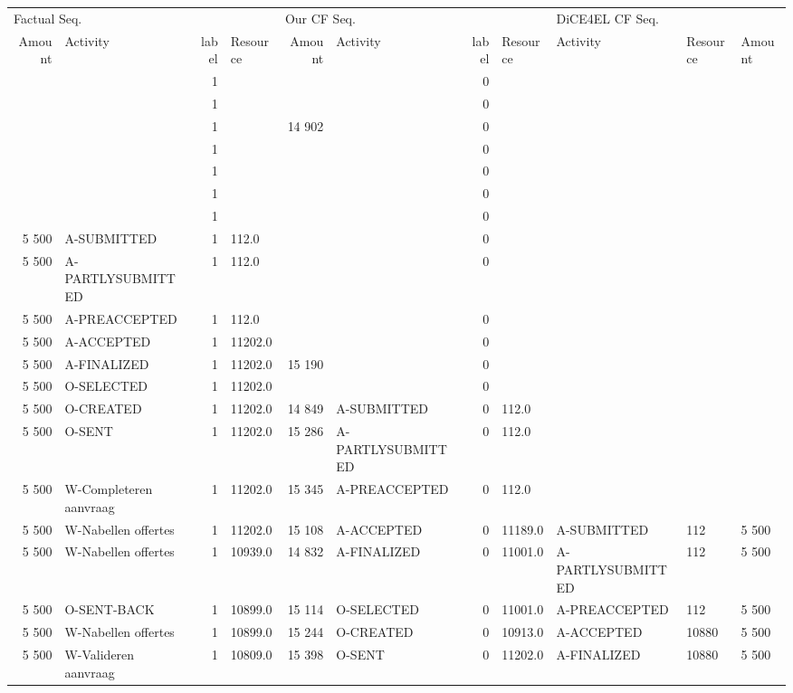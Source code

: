 \begin{tabular}{rlrlrlrllll}
\toprule
\multicolumn{4}{l}{Factual Seq.} & \multicolumn{4}{l}{Our CF Seq.} & \multicolumn{3}{l}{DiCE4EL CF Seq.} \\
Amount & Activity & label & Resource & Amount & Activity & label & Resource & Activity & Resource & Amount \\
\midrule
 &  & 1 &  &  &  & 0 &  &  &  &  \\
 &  & 1 &  &  &  & 0 &  &  &  &  \\
 &  & 1 &  & 14 902 &  & 0 &  &  &  &  \\
 &  & 1 &  &  &  & 0 &  &  &  &  \\
 &  & 1 &  &  &  & 0 &  &  &  &  \\
 &  & 1 &  &  &  & 0 &  &  &  &  \\
 &  & 1 &  &  &  & 0 &  &  &  &  \\
5 500 & A-SUBMITTED & 1 & 112.0 &  &  & 0 &  &  &  &  \\
5 500 & A-PARTLYSUBMITTED & 1 & 112.0 &  &  & 0 &  &  &  &  \\
5 500 & A-PREACCEPTED & 1 & 112.0 &  &  & 0 &  &  &  &  \\
5 500 & A-ACCEPTED & 1 & 11202.0 &  &  & 0 &  &  &  &  \\
5 500 & A-FINALIZED & 1 & 11202.0 & 15 190 &  & 0 &  &  &  &  \\
5 500 & O-SELECTED & 1 & 11202.0 &  &  & 0 &  &  &  &  \\
5 500 & O-CREATED & 1 & 11202.0 & 14 849 & A-SUBMITTED & 0 & 112.0 &  &  &  \\
5 500 & O-SENT & 1 & 11202.0 & 15 286 & A-PARTLYSUBMITTED & 0 & 112.0 &  &  &  \\
5 500 & W-Completeren aanvraag & 1 & 11202.0 & 15 345 & A-PREACCEPTED & 0 & 112.0 &  &  &  \\
5 500 & W-Nabellen offertes & 1 & 11202.0 & 15 108 & A-ACCEPTED & 0 & 11189.0 & A-SUBMITTED & 112 & 5 500 \\
5 500 & W-Nabellen offertes & 1 & 10939.0 & 14 832 & A-FINALIZED & 0 & 11001.0 & A-PARTLYSUBMITTED & 112 & 5 500 \\
5 500 & O-SENT-BACK & 1 & 10899.0 & 15 114 & O-SELECTED & 0 & 11001.0 & A-PREACCEPTED & 112 & 5 500 \\
5 500 & W-Nabellen offertes & 1 & 10899.0 & 15 244 & O-CREATED & 0 & 10913.0 & A-ACCEPTED & 10880 & 5 500 \\
5 500 & W-Valideren aanvraag & 1 & 10809.0 & 15 398 & O-SENT & 0 & 11202.0 & A-FINALIZED & 10880 & 5 500 \\

\end{tabular}
